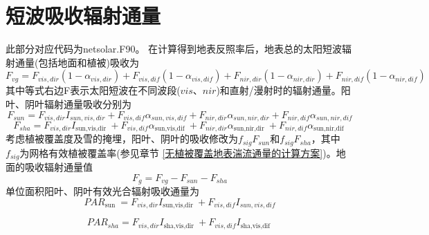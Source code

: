 \section{短波吸收辐射通量}\label{短波吸收辐射通量}
此部分对应代码为netsolar.F90。
在计算得到地表反照率后，地表总的太阳短波辐射通量(包括地面和植被)吸收为
\begin{equation}
F_{v g}=F_{vis,dir}\left(1-\alpha_{vis,dir}\right)+F_{vis,dif}\left(1-\alpha_{vis,dif}\right)+
F_{nir,dir}\left(1-\alpha_{nir,dir}\right)+F_{nir,dif}\left(1-\alpha_{nir,dif}\right)
\end{equation}
其中等式右边F表示太阳短波在不同波段($vis$、$nir$)和直射/漫射时的辐射通量。阳叶、阴叶辐射通量吸收分别为
\begin{equation}
F_{s u n}=F_{vi s, dir} I_{s u n, vi s, dir}+F_{vis, dif} \alpha_{s u n, vis, dif}+F_{ni r, dir} \alpha_{s u n, ni r, dir}+F_{nir, dif} \alpha_{s u n, nir, dif}
\end{equation}
\begin{equation}
F_{s h a}=F_{vi s, dir} I_{\text {sun,vis,dir }}+F_{vis, dif} \alpha_{\text {sun,vis,dif }}+F_{ni r, dir} \alpha_{\text {sun,nir,dir }}+F_{nir, dif} \alpha_{\text {sun,nir,dif }}
\end{equation}
考虑植被覆盖度及雪的掩埋，阳叶、阴叶的吸收修改为$f_{sig}F_{sun}$和$f_{sig}F_{sha}$，其中$f_{sig}$为网格有效植被覆盖率(参见章节 \ref{无植被覆盖地表湍流通量的计算方案})。地面的吸收辐射通量值
\begin{equation}
F_{g}=F_{v g}-F_{s u n}-F_{s h a}
\end{equation}
单位面积阳叶、阴叶有效光合辐射吸收通量为
\begin{equation}
P A R_{\text {sun }}=F_{vi s, dir} I_{\text {sun,vis,dir }}+F_{vis, dif} I_{s u n, vis, dif}
\end{equation}

\begin{equation}
P A R_{s h a}=F_{vi s, dir} I_{\text {sha,vis,dir }}+F_{vis, dif} I_{\text {sha,vis,dif }}
\end{equation}


